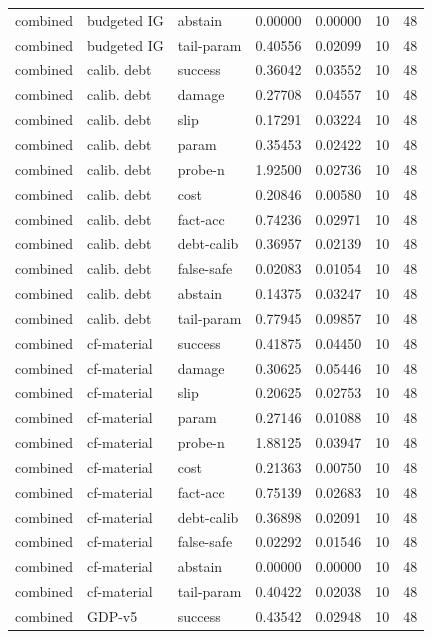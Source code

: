 \documentclass{article}
\begin{document}
\begin{center}
\begin{longtable}{lllllll}
combined & budgeted IG & abstain & 0.00000 & 0.00000 & 10 & 48 \\
combined & budgeted IG & tail-param & 0.40556 & 0.02099 & 10 & 48 \\
combined & calib. debt & success & 0.36042 & 0.03552 & 10 & 48 \\
combined & calib. debt & damage & 0.27708 & 0.04557 & 10 & 48 \\
combined & calib. debt & slip & 0.17291 & 0.03224 & 10 & 48 \\
combined & calib. debt & param & 0.35453 & 0.02422 & 10 & 48 \\
combined & calib. debt & probe-n & 1.92500 & 0.02736 & 10 & 48 \\
combined & calib. debt & cost & 0.20846 & 0.00580 & 10 & 48 \\
combined & calib. debt & fact-acc & 0.74236 & 0.02971 & 10 & 48 \\
combined & calib. debt & debt-calib & 0.36957 & 0.02139 & 10 & 48 \\
combined & calib. debt & false-safe & 0.02083 & 0.01054 & 10 & 48 \\
combined & calib. debt & abstain & 0.14375 & 0.03247 & 10 & 48 \\
combined & calib. debt & tail-param & 0.77945 & 0.09857 & 10 & 48 \\
combined & cf-material & success & 0.41875 & 0.04450 & 10 & 48 \\
combined & cf-material & damage & 0.30625 & 0.05446 & 10 & 48 \\
combined & cf-material & slip & 0.20625 & 0.02753 & 10 & 48 \\
combined & cf-material & param & 0.27146 & 0.01088 & 10 & 48 \\
combined & cf-material & probe-n & 1.88125 & 0.03947 & 10 & 48 \\
combined & cf-material & cost & 0.21363 & 0.00750 & 10 & 48 \\
combined & cf-material & fact-acc & 0.75139 & 0.02683 & 10 & 48 \\
combined & cf-material & debt-calib & 0.36898 & 0.02091 & 10 & 48 \\
combined & cf-material & false-safe & 0.02292 & 0.01546 & 10 & 48 \\
combined & cf-material & abstain & 0.00000 & 0.00000 & 10 & 48 \\
combined & cf-material & tail-param & 0.40422 & 0.02038 & 10 & 48 \\
combined & GDP-v5 & success & 0.43542 & 0.02948 & 10 & 48 \\
\bottomrule
\end{longtable}
\renewcommand{\arraystretch}{1.0}
\end{center}
\end{document}
